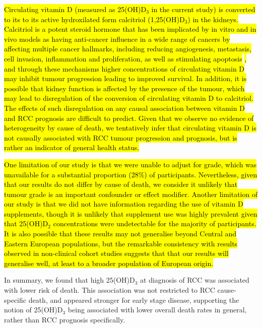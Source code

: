 \documentclass[a4paper,11pt]{article}
\begin{document}
\hl{Circulating vitamin D (measured as 25(OH)D$_3$ in the current study) is 
converted to its to its active hydroxilated form calcitriol (1,25(OH)D$_3$) in the 
kidneys. Calcitriol is a potent steroid hormone that has been implicated by in vitro 
and in vivo models as having anti-cancer influence in a wide range of cancers by 
affecting multiple cancer hallmarks, including reducing angiogenesis, metastasis, 
cell invasion, inflammation and proliferation, as well as stimulating apoptosis} 
\cite{feldman_role_2014}\hl{, and through these mechanisms higher concentrations of 
circulating vitamin D may inhibit tumour progression leading to improved survival. In 
addition, it is possible that kidney function is affected by the presence of the 
tumour, which may lead to disregulation of the conversion of circulating vitamin D to 
calcitriol. The effects of such disregulation on any causal association between 
vitamin D and RCC prognosis are difficult to predict. Given that we observe no 
evidence of heterogeneity by cause of death, we tentatively infer that circulating 
vitamin D is not causally associated with RCC tumour progression and prognosis, but 
is rather an indicator of general health status.}

\hl{One limitation of our study is that we were unable to adjust for grade, which was 
unavailable for a substantial proportion (28\%) of participants. Nevertheless, 
given that our results do not differ by cause of death, we consider it unlikely that 
tumour grade is an important confounder or effect modifier.  Another limitation of 
our study is that we did not have information regarding the use of vitamin D 
supplements, though it is unlikely that supplement use was highly prevalent given 
that 25(OH)D$_2$ concentrations were undetectable for the majority of participants. 
It is also possible that these results may not generalise beyond Central and Eastern 
European populations, but the remarkable consistency with results observed in 
non-clinical cohort studies suggests that that our results will generalise well, at 
least to a broader population of European origin.}

In summary, we found that high 25(OH)D$_3$ at diagnosis of RCC was associated 
with lower risk of death. This association was not restricted to RCC 
cause-specific death, and appeared stronger for early stage disease, 
supporting the notion of 25(OH)D$_3$ being associated with lower overall death 
rates in general, rather than RCC prognosis specifically. 
\end{document}
